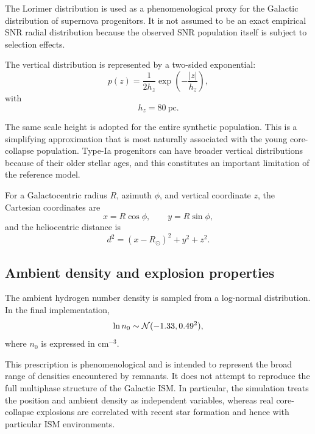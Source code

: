 \documentclass[
aps,
prd,
reprint,
superscriptaddress,
nofootinbib
]{revtex4-2}
\newcommand{\pc}{\mathrm{pc}}
\begin{document}
	The Lorimer distribution is used as a phenomenological proxy for the
	Galactic distribution of supernova progenitors.  It is not assumed to be an
	exact empirical SNR radial distribution because the observed SNR population
	itself is subject to selection effects.
	
	The vertical distribution is represented by a two-sided exponential:
	\begin{equation}
		p(z)
		=
		\frac{1}{2h_z}
		\exp\left(-\frac{|z|}{h_z}\right),
		\label{eq:z}
	\end{equation}
	with
	\begin{equation}
		h_z=80~\pc.
		\label{eq:hz}
	\end{equation}
	
	The same scale height is adopted for the entire synthetic population.  This
	is a simplifying approximation that is most naturally associated with the
	young core-collapse population.  Type-Ia progenitors can have broader vertical
	distributions because of their older stellar ages, and this constitutes an
	important limitation of the reference model.
	
	For a Galactocentric radius $R$, azimuth $\phi$, and vertical coordinate $z$,
	the Cartesian coordinates are
	\begin{equation}
		x=R\cos\phi,
		\qquad
		y=R\sin\phi,
	\end{equation}
	and the heliocentric distance is
	\begin{equation}
		d^2
		=
		(x-R_\odot)^2+y^2+z^2.
		\label{eq:distance}
	\end{equation}
	
	\subsection{Ambient density and explosion properties}
	
	The ambient hydrogen number density is sampled from a log-normal distribution.
	In the final implementation,
	\begin{equation}
		\ln n_0
		\sim
		{\cal N}(-1.33,0.49^2),
		\label{eq:density}
	\end{equation}
	where $n_0$ is expressed in $\mathrm{cm^{-3}}$.
	
	This prescription is phenomenological and is intended to represent the broad
	range of densities encountered by remnants.  It does not attempt to reproduce
	the full multiphase structure of the Galactic ISM.  In particular, the
	simulation treats the position and ambient density as independent variables,
	whereas real core-collapse explosions are correlated with recent star
	formation and hence with particular ISM environments.
	
\end{document}
